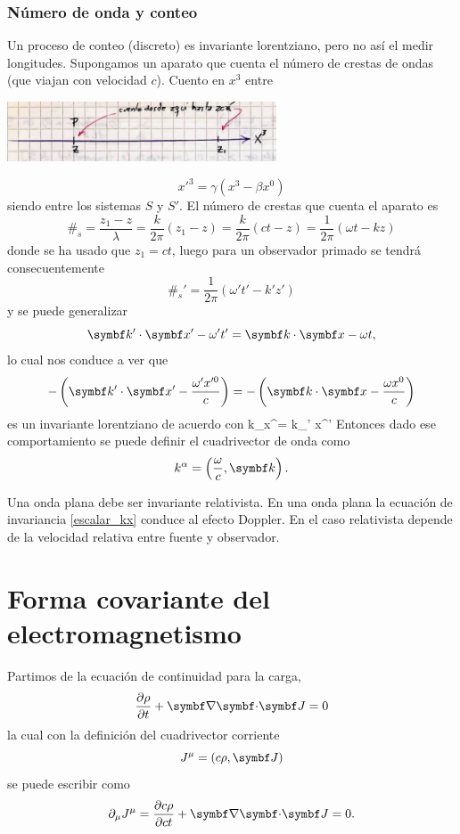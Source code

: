 \documentclass[10pt,oneside]{CBFT_book}
\begin{document}
\subsubsection{Número de onda y conteo}

Un proceso de conteo (discreto) es invariante lorentziano, pero no así el medir
longitudes.
Supongamos un aparato que cuenta el número de crestas de ondas (que viajan con velocidad
$c$).
Cuento en $x^3$ entre

\includegraphics[width=0.6\textwidth]{images/fig_ft1_sr_ondas.jpg}

\[
	x'^3 = \gamma ( x^3 - \beta x^0 )
\]
siendo  entre los sistemas $S$ y $S'$.
El número de crestas que cuenta el aparato es 
\[
	\#_s = \frac{ z_1 - z }{ \lambda } = \frac{ k }{ 2\pi }( z_1 - z ) = \frac{ k }{ 2\pi }( ct - z ) = 
	\frac{ 1 }{ 2\pi }( \omega t - kz )
\]
donde se ha usado que $z_1 = ct $, luego para un observador primado se tendrá consecuentemente
\[
	\#_s' = \frac{ 1 }{ 2\pi }( \omega' t' - k'z' )
\]
y se puede generalizar
\[
	\pe{k'}{x'} - \omega' t' = \pe{k}{x} - \omega t,
\]
lo cual nos conduce a ver que
\[
	-\left( \pe{k'}{x'} - \frac{\omega' x'^0 }{c} \right) = 
	-\left( \pe{k}{x} - \frac{\omega x^0 }{c}  \right)
\]
es un invariante lorentziano de acuerdo con
\be
	k_\alpha x^\alpha = k_{\alpha}' x^{'\alpha}
	\label{escalar_kx}
\ee
Entonces dado ese comportamiento se puede definir el cuadrivector de onda como
\[
	k^\alpha = \left( \frac{\omega}{c}, \vb{k}\right).
\]

Una onda plana debe ser invariante relativista. En una onda plana la ecuación de invariancia
\eqref{escalar_kx} conduce al efecto Doppler. En el caso relativista depende de la velocidad
relativa entre fuente y observador.

\section{Forma covariante del electromagnetismo}

Partimos de la ecuación de continuidad para la carga,
\[
	\dpar{\rho}{t} + \divem{J} = 0
\]
la cual con la definición del cuadrivector corriente
\[
	J^\mu = ( c\rho , \vb{J} )
\]
se puede escribir como 
\[
	\partial_\mu J^\mu = \dpar{c\rho}{ct} + \divem{J} = 0 .
\]
\end{document}
